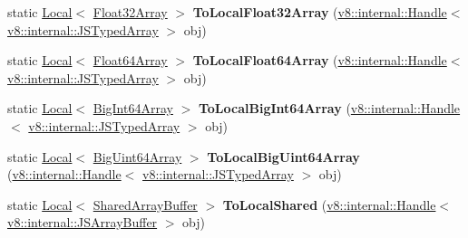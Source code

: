 \begin{DoxyCompactItemize}
static \mbox{\hyperlink{classv8_1_1Local}{Local}}$<$ \mbox{\hyperlink{classv8_1_1Float32Array}{Float32\+Array}} $>$ {\bfseries To\+Local\+Float32\+Array} (\mbox{\hyperlink{classv8_1_1internal_1_1Handle}{v8\+::internal\+::\+Handle}}$<$ \mbox{\hyperlink{classv8_1_1internal_1_1JSTypedArray}{v8\+::internal\+::\+J\+S\+Typed\+Array}} $>$ obj)
\item 
\mbox{\label{classv8_1_1Utils_a64bca553c7a7e8dd818e10c937ba0f22}} 
static \mbox{\hyperlink{classv8_1_1Local}{Local}}$<$ \mbox{\hyperlink{classv8_1_1Float64Array}{Float64\+Array}} $>$ {\bfseries To\+Local\+Float64\+Array} (\mbox{\hyperlink{classv8_1_1internal_1_1Handle}{v8\+::internal\+::\+Handle}}$<$ \mbox{\hyperlink{classv8_1_1internal_1_1JSTypedArray}{v8\+::internal\+::\+J\+S\+Typed\+Array}} $>$ obj)
\item 
\mbox{\label{classv8_1_1Utils_a4aebcb141df189dd27ea62ac23c2ae2c}} 
static \mbox{\hyperlink{classv8_1_1Local}{Local}}$<$ \mbox{\hyperlink{classv8_1_1BigInt64Array}{Big\+Int64\+Array}} $>$ {\bfseries To\+Local\+Big\+Int64\+Array} (\mbox{\hyperlink{classv8_1_1internal_1_1Handle}{v8\+::internal\+::\+Handle}}$<$ \mbox{\hyperlink{classv8_1_1internal_1_1JSTypedArray}{v8\+::internal\+::\+J\+S\+Typed\+Array}} $>$ obj)
\item 
\mbox{\label{classv8_1_1Utils_afe7b270db73a1901eaae683a4a83a1b2}} 
static \mbox{\hyperlink{classv8_1_1Local}{Local}}$<$ \mbox{\hyperlink{classv8_1_1BigUint64Array}{Big\+Uint64\+Array}} $>$ {\bfseries To\+Local\+Big\+Uint64\+Array} (\mbox{\hyperlink{classv8_1_1internal_1_1Handle}{v8\+::internal\+::\+Handle}}$<$ \mbox{\hyperlink{classv8_1_1internal_1_1JSTypedArray}{v8\+::internal\+::\+J\+S\+Typed\+Array}} $>$ obj)
\item 
\mbox{\label{classv8_1_1Utils_a09a6164d349d6cc5deb6fa6078e853b5}} 
static \mbox{\hyperlink{classv8_1_1Local}{Local}}$<$ \mbox{\hyperlink{classv8_1_1SharedArrayBuffer}{Shared\+Array\+Buffer}} $>$ {\bfseries To\+Local\+Shared} (\mbox{\hyperlink{classv8_1_1internal_1_1Handle}{v8\+::internal\+::\+Handle}}$<$ \mbox{\hyperlink{classv8_1_1internal_1_1JSArrayBuffer}{v8\+::internal\+::\+J\+S\+Array\+Buffer}} $>$ obj)
\item 
\mbox{\label{classv8_1_1Utils_abb489951956cbf3fa09c36322a2377f3}} 

\end{DoxyCompactItemize}
